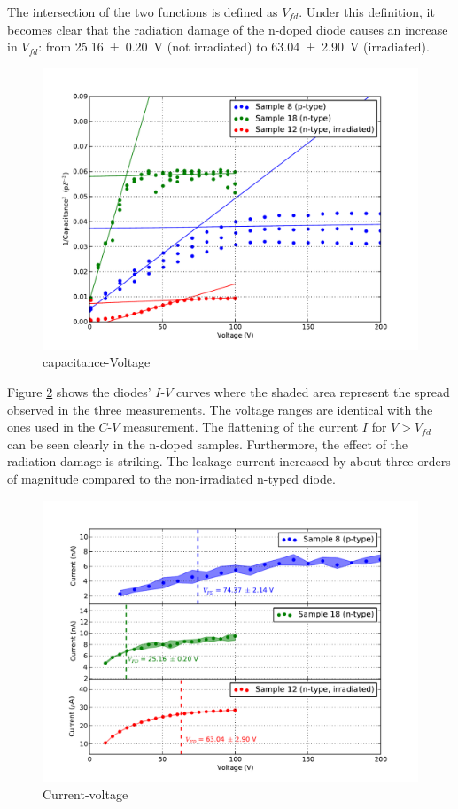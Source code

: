 \documentclass[11pt]{report}
\begin{document}
 The intersection of the two functions is defined as $V_{fd}$.
Under this definition, it becomes clear that the radiation damage of the n-doped diode causes an increase in $V_{fd}$: from \SI{25.16\pm0.20}{V} (not irradiated) to \SI{63.04\pm2.90}{V} (irradiated).



\label{sec:results}
\begin{figure}
  \centering
  \includegraphics[width=\textwidth]{./figures/cv.pdf}  
  \caption{capacitance-Voltage }
  \label{fig:cv}
\end{figure}

Figure \ref{fig:iv} shows the diodes' $I$-$V$ curves where the shaded area represent the spread observed in the three measurements.
The voltage ranges are identical with the ones used in the $C$-$V$ measurement.
The flattening of the current $I$ for $V>V_{fd}$ can be seen clearly in the n-doped samples.
Furthermore, the effect of the radiation damage is striking.
The leakage current increased by about three orders of magnitude compared to the non-irradiated n-typed diode.

\begin{figure}
  \centering
  \includegraphics[width=\textwidth]{./figures/iv.pdf}
  \caption{Current-voltage}
  \label{fig:iv}
\end{figure}
\end{document}

